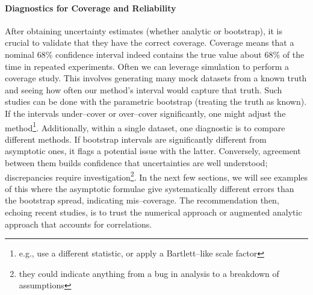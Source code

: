         \paragraph{Diagnostics for Coverage and Reliability}
            After obtaining uncertainty estimates (whether analytic or bootstrap), it is crucial to validate that they have the correct coverage.
            Coverage means that a nominal 68\% confidence interval indeed contains the true value about 68\% of the time in repeated experiments.
            Often we can leverage simulation to perform a coverage study.
            This involves generating many mock datasets from a known truth and seeing how often our method's interval would capture that truth.
            Such studies can be done with the parametric bootstrap (treating the truth as known).
            If the intervals under--cover or over--cover significantly, one might adjust the method\footnote{e.g., use a different statistic, or apply a Bartlett--like scale factor}.
            Additionally, within a single dataset, one diagnostic is to compare different methods.
            If bootstrap intervals are significantly different from asymptotic ones, it flags a potential issue with the latter.
            Conversely, agreement between them builds confidence that uncertainties are well understood; discrepancies require investigation\footnote{they could indicate anything from a bug in analysis to a breakdown of assumptions}.
            In the next few sections, we will see examples of this where the asymptotic formulae give systematically different errors than the bootstrap spread, indicating mis--coverage.
            The recommendation then, echoing recent studies, is to trust the numerical approach or augmented analytic approach that accounts for correlations.
